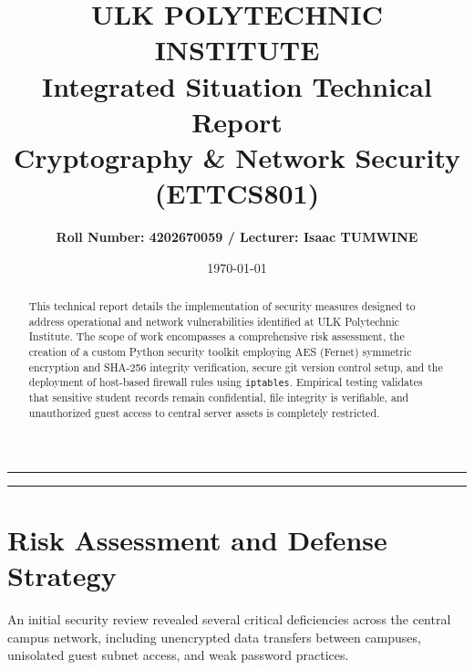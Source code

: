 \documentclass[12pt,a4paper]{article}
\title{
    \vspace{-1.2cm}
    \textbf{\Large ULK POLYTECHNIC INSTITUTE}\\
    \vspace{0.2cm}
    \textbf{\Large Integrated Situation Technical Report}\\
    \large Cryptography \& Network Security (ETTCS801)
}
\author{\textbf{Roll Number: 4202670059 / Lecturer: Isaac TUMWINE}}
\date{\today}
\begin{document}
\maketitle
\thispagestyle{empty}

\hrule
\vspace{0.2cm}

\begin{abstract}
This technical report details the implementation of security measures designed to address operational and network vulnerabilities identified at ULK Polytechnic Institute. The scope of work encompasses a comprehensive risk assessment, the creation of a custom Python security toolkit employing AES (Fernet) symmetric encryption and SHA-256 integrity verification, secure git version control setup, and the deployment of host-based firewall rules using \texttt{iptables}. Empirical testing validates that sensitive student records remain confidential, file integrity is verifiable, and unauthorized guest access to central server assets is completely restricted.
\end{abstract}

\vspace{0.2cm}
\hrule
\vspace{0.3cm}

\section{Risk Assessment and Defense Strategy}

An initial security review revealed several critical deficiencies across the central campus network, including unencrypted data transfers between campuses, unisolated guest subnet access, and weak password practices.
\end{document}
